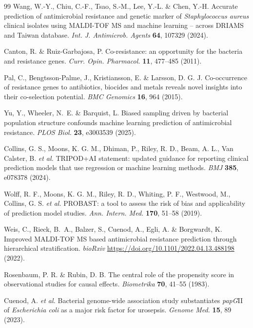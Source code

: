 \documentclass[11pt]{article}
\begin{document}
\begin{thebibliography}{99}
Wang, W.-Y., Chiu, C.-F., Tsao, S.-M., Lee, Y.-L. \& Chen, Y.-H. Accurate prediction of antimicrobial resistance and genetic marker of \textit{Staphylococcus aureus} clinical isolates using MALDI-TOF MS and machine learning -- across DRIAMS and Taiwan database. \textit{Int. J. Antimicrob. Agents} \textbf{64}, 107329 (2024).

Canton, R. \& Ruiz-Garbajosa, P. Co-resistance: an opportunity for the bacteria and resistance genes. \textit{Curr. Opin. Pharmacol.} \textbf{11}, 477--485 (2011).

Pal, C., Bengtsson-Palme, J., Kristiansson, E. \& Larsson, D. G. J. Co-occurrence of resistance genes to antibiotics, biocides and metals reveals novel insights into their co-selection potential. \textit{BMC Genomics} \textbf{16}, 964 (2015).

Yu, Y., Wheeler, N.~E. \& Barquist, L. Biased sampling driven by bacterial population structure confounds machine learning prediction of antimicrobial resistance. \textit{PLOS Biol.} \textbf{23}, e3003539 (2025).

Collins, G. S., Moons, K. G. M., Dhiman, P., Riley, R. D., Beam, A. L., Van Calster, B. \textit{et al.} TRIPOD+AI statement: updated guidance for reporting clinical prediction models that use regression or machine learning methods. \textit{BMJ} \textbf{385}, e078378 (2024).

Wolff, R. F., Moons, K. G. M., Riley, R. D., Whiting, P. F., Westwood, M., Collins, G. S. \textit{et al.} PROBAST: a tool to assess the risk of bias and applicability of prediction model studies. \textit{Ann. Intern. Med.} \textbf{170}, 51--58 (2019).

Weis, C., Rieck, B.~A., Balzer, S., Cuenod, A., Egli, A. \& Borgwardt, K. Improved MALDI-TOF MS based antimicrobial resistance prediction through hierarchical stratification. \textit{bioRxiv} \url{https://doi.org/10.1101/2022.04.13.488198} (2022).

Rosenbaum, P. R. \& Rubin, D. B. The central role of the propensity score in observational studies for causal effects. \textit{Biometrika} \textbf{70}, 41--55 (1983).

Cuenod, A. \textit{et al.} Bacterial genome-wide association study substantiates \textit{papG}II of \textit{Escherichia coli} as a major risk factor for urosepsis. \textit{Genome Med.} \textbf{15}, 89 (2023).


\end{thebibliography}
\end{document}

